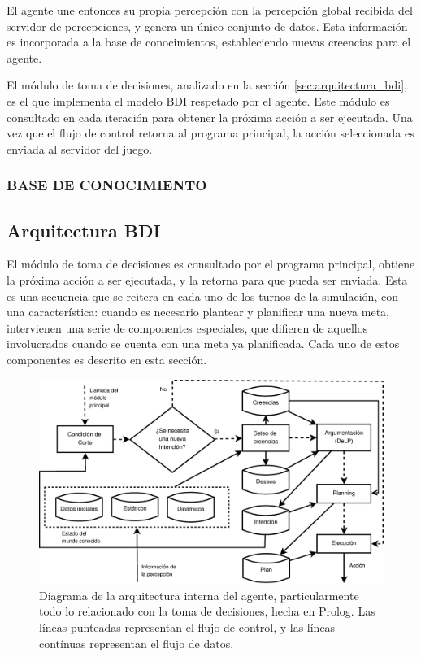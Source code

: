  El agente une entonces su propia percepción con la percepción global
 recibida del servidor de percepciones, y genera un único conjunto de
 datos.
 Esta información es incorporada a la base de conocimientos,
 estableciendo nuevas creencias para el agente.
 
 El módulo de toma de decisiones, analizado en la sección
 \ref{sec:arquitectura_bdi}, es el que implementa el modelo BDI
 respetado por el agente.
 Este módulo es consultado en cada iteración para obtener la próxima
 acción a ser ejecutada.
 Una vez que el flujo de control retorna al programa principal, la
 acción seleccionada es enviada al servidor del juego.
  
\subsubsection{BASE DE CONOCIMIENTO}

\subsection{Arquitectura BDI} 
 \label{sub:arquitectura_bdi}

 El módulo de toma de decisiones es consultado por el programa
 principal, obtiene la próxima acción a ser ejecutada, y la retorna
 para que pueda ser enviada.
 Esta es una secuencia que se reitera en cada uno de los turnos de la
 simulación, con una característica: cuando es necesario plantear y
 planificar una nueva meta, intervienen una serie de componentes
 especiales, que difieren de aquellos involucrados cuando se cuenta con
 una meta ya planificada.
 Cada uno de estos componentes es descrito en esta sección.
 
 \begin{figure}[ht]
 \centering
 \includegraphics[scale=.3]{graficos/eps/agent_prolog.eps}
 \caption{Diagrama de la arquitectura interna del agente,
 particularmente todo lo relacionado con la toma de decisiones, hecha
 en Prolog.
 Las líneas punteadas representan el flujo de control, y
 las líneas contínuas representan el flujo de datos.}
 \label{fig:agent_prolog}
 \end{figure}
  
